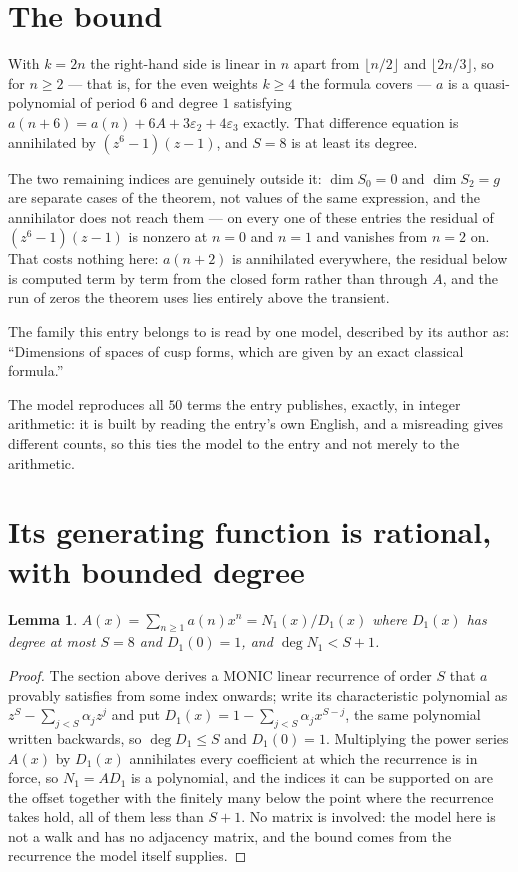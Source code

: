 \documentclass[11pt,a4paper]{article}
\theoremstyle{plain}
\newtheorem{lemma}[theorem]{Lemma}
\theoremstyle{definition}
\begin{document}
\section{The bound}

With $k=2n$ the right-hand side is linear in $n$ apart from $\lfloor n/2\rfloor$ and
$\lfloor 2n/3\rfloor$, so for $n\ge2$ --- that is, for the even weights $k\ge4$ the formula
covers --- $a$ is a quasi-polynomial of period $6$ and degree $1$ satisfying
$a(n+6)=a(n)+6A+3\varepsilon_2+4\varepsilon_3$ exactly. That difference equation is annihilated
by $(z^6-1)(z-1)$, and $S=8$ is at least its degree.

The two remaining indices are genuinely outside it: $\dim S_0=0$ and $\dim S_2=g$ are separate
cases of the theorem, not values of the same expression, and the annihilator does not reach
them --- on every one of these entries the residual of $(z^6-1)(z-1)$ is nonzero at $n=0$ and
$n=1$ and vanishes from $n=2$ on. That costs nothing here: $a(n+2)$ is annihilated everywhere,
the residual below is computed term by term from the closed form rather than through $A$, and
the run of zeros the theorem uses lies entirely above the transient.

The family this entry belongs to is read by one model, described by its author as: ``Dimensions of spaces of cusp forms, which are given by an exact classical formula.''


The model reproduces all $50$ terms the entry publishes, exactly, in integer arithmetic:
it is built by reading the entry's own English, and a misreading gives different counts, so
this ties the model to the entry and not merely to the arithmetic.

\section{Its generating function is rational, with bounded degree}

\begin{lemma}\label{lem:rat}
$A(x)=\sum_{n\ge1}a(n)x^n=N_1(x)/D_1(x)$ where $D_1(x)$ has degree at most $S=8$ and
$D_1(0)=1$, and $\deg N_1<S+1$.
\end{lemma}

\begin{proof}
The section above derives a MONIC linear recurrence of order $S$ that $a$ provably satisfies
from some index onwards; write its characteristic polynomial as $z^S-\sum_{j<S}\alpha_jz^j$
and put $D_1(x)=1-\sum_{j<S}\alpha_jx^{S-j}$, the same polynomial written backwards, so
$\deg D_1\le S$ and $D_1(0)=1$. Multiplying the power series $A(x)$ by $D_1(x)$ annihilates
every coefficient at which the recurrence is in force, so $N_1=AD_1$ is a polynomial, and the
indices it can be supported on are the offset together with the finitely many below the point
where the recurrence takes hold, all of them less than $S+1$. No matrix is involved: the
model here is not a walk and has no adjacency matrix, and the bound comes from the recurrence
the model itself supplies.
\end{proof}
\end{document}
